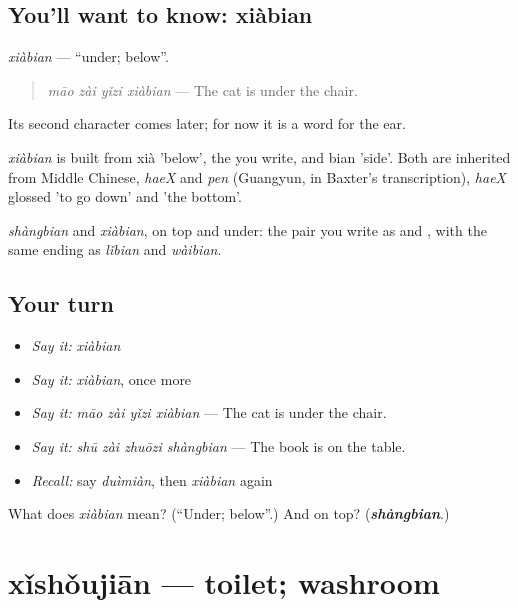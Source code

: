 \subsection*{You'll want to know: xiàbian}
\emph{xiàbian} — \textquotedblleft{}under; below\textquotedblright{}.

\begin{quote}
\emph{māo zài yǐzi xiàbian} — The cat is under the chair.
\end{quote}

Its second character comes later; for now it is a word for the ear.

\begin{cousinweb}
\emph{xiàbian} is built from xià 'below', the  you write, and bian 'side'. Both are inherited from Middle Chinese, \emph{haeX} and \emph{pen} (Guangyun, in Baxter's transcription), \emph{haeX} glossed 'to go down' and 'the bottom'.
\end{cousinweb}

\begin{grammarlens}[title={What you've built}]
\emph{shàngbian} and \emph{xiàbian}, on top and under: the pair you write as  and , with the same ending as \emph{lǐbian} and \emph{wàibian}.
\end{grammarlens}

\subsection*{Your turn}
\begin{itemize}
\raggedright
  \item \emph{Say it:} \emph{xiàbian}
  \item \emph{Say it:} \emph{xiàbian}, once more
  \item \emph{Say it:} \emph{māo zài yǐzi xiàbian} — The cat is under the chair.
  \item \emph{Say it:} \emph{shū zài zhuōzi shàngbian} — The book is on the table.
  \item \emph{Recall:} say \emph{duìmiàn}, then \emph{xiàbian} again
\end{itemize}

\begin{tcolorbox}[breakable,colback=teal!4,colframe=teal!35!black,title={Before you move on}]
What does \emph{xiàbian} mean? (\textquotedblleft{}Under; below\textquotedblright{}.) And on top? (\emph{\textbf{shàngbian}}.)
\end{tcolorbox}
\section[xǐshǒujiān]{xǐshǒujiān — toilet; washroom}


